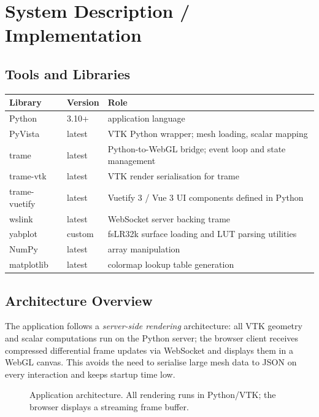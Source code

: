 \documentclass[11pt,letterpaper]{article}
\begin{document}
\section{System Description / Implementation}
\label{sec:system}

\subsection{Tools and Libraries}

\begin{center}
\begin{tabular}{lll}
\toprule
Library & Version & Role\\
\midrule
Python      & 3.10+  & application language \\
PyVista     & latest & VTK Python wrapper; mesh loading, scalar mapping \\
trame       & latest & Python-to-WebGL bridge; event loop and state management \\
trame-vtk   & latest & VTK render serialisation for trame \\
trame-vuetify & latest & Vuetify 3 / Vue 3 UI components defined in Python \\
wslink      & latest & WebSocket server backing trame \\
yabplot     & custom & fsLR32k surface loading and LUT parsing utilities \\
NumPy       & latest & array manipulation \\
matplotlib  & latest & colormap lookup table generation \\
\bottomrule
\end{tabular}
\end{center}

\subsection{Architecture Overview}

The application follows a \emph{server-side rendering} architecture:
all VTK geometry and scalar computations run on the Python server;
the browser client receives compressed differential frame updates
via WebSocket and displays them in a WebGL canvas.
This avoids the need to serialise large mesh data to JSON on every
interaction and keeps startup time low.

\begin{figure}[h]
  \centering
  \caption{Application architecture. All rendering runs in Python/VTK;
           the browser displays a streaming frame buffer.}
  \label{fig:arch}
\end{figure}
\end{document}
